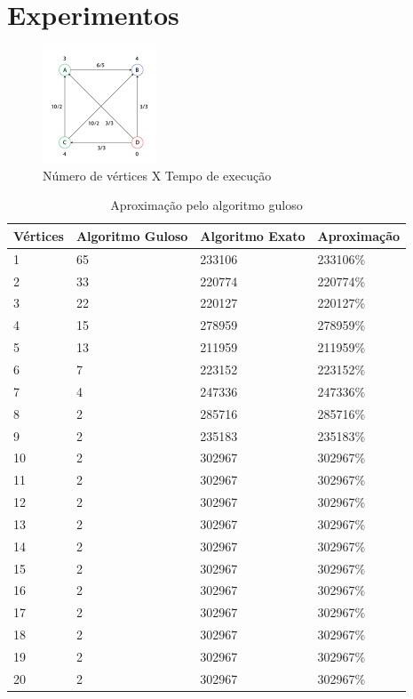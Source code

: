 \documentclass{article}
\begin{document}
\section{Experimentos}

\begin{figure}
  \center
  \includegraphics[width=128px]{graph.png}
  \caption{Número de vértices X Tempo de execução}
  \label{fig:execution_time}
\end{figure}

\begin{table}
\centering
\begin{tabular}{ |l|l|l|l| }
  \hline
  Vértices & Algoritmo Guloso & Algoritmo Exato & Aproximação \\
  \hline
  1  & 65               & 233106 & 233106\% \\
  2  & 33               & 220774 & 220774\% \\
  3  & 22               & 220127 & 220127\% \\               
  4  & 15               & 278959 & 278959\% \\               
  5  & 13               & 211959 & 211959\% \\              
  6  & 7                & 223152 & 223152\% \\               
  7  & 4                & 247336 & 247336\% \\               
  8  & 2                & 285716 & 285716\% \\               
  9  & 2                & 235183 & 235183\% \\
  10 & 2                & 302967 & 302967\% \\               
  11 & 2                & 302967 & 302967\% \\               
  12 & 2                & 302967 & 302967\% \\               
  13 & 2                & 302967 & 302967\% \\               
  14 & 2                & 302967 & 302967\% \\               
  15 & 2                & 302967 & 302967\% \\               
  16 & 2                & 302967 & 302967\% \\               
  17 & 2                & 302967 & 302967\% \\               
  18 & 2                & 302967 & 302967\% \\               
  19 & 2                & 302967 & 302967\% \\               
  20 & 2                & 302967 & 302967\% \\               
  \hline
\end{tabular}
\caption{Aproximação pelo algoritmo guloso}
\label{tab:greedy_approximation}
\end{table}
\end{document}
